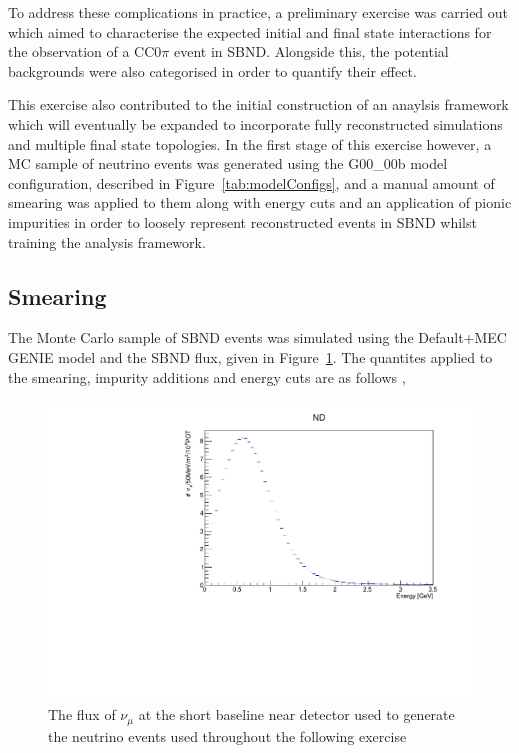 To address these complications in practice, a preliminary exercise was carried out which aimed to characterise the expected initial and final state interactions for the observation of a CC0\(\pi\) event in SBND. Alongside this, the potential backgrounds were also categorised in order to quantify their effect. 

This exercise also contributed to the initial construction of an anaylsis framework which will eventually be expanded to incorporate fully reconstructed simulations and multiple final state topologies. In the first stage of this exercise however, a MC sample of neutrino events was generated using the G00\_00b model configuration, described in Figure~\ref{tab:modelConfigs}, and a manual amount of smearing was applied to them along with energy cuts and an application of pionic impurities in order to loosely represent reconstructed events in SBND whilst training the analysis framework.  

\subsection{Smearing}

The Monte Carlo sample of SBND events was simulated using the Default+MEC GENIE model and the SBND flux, given in Figure~\ref{fig:SBNDFlux}. The quantites applied to the smearing, impurity additions and energy cuts are as follows \footnotemark,


    \begin{figure}[h!]
        \centering
        \includegraphics[width=.7\textwidth, trim=0 0 0 1cm, clip]{images/sbnd_flux.pdf}
        \caption{The flux of \(\nu_{\mu}\) at the short baseline near detector used to generate the neutrino events used throughout the following exercise}
        \label{fig:SBNDFlux}
    \end{figure}

